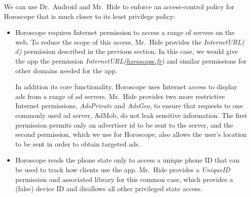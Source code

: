 \documentclass[preprint]{sig-alternate-10pt}
\newcommand{\lib}{Mr.\ Hide\xspace}
\newcommand{\rewriter}{Dr.\ Android\xspace}
\newcommand{\perm}[1]{\textsf{\textit{#1}}}
\newcommand{\comment}[3][\color{red}]{}%
\newcommand{\tdm}[1]{\comment[\color{red}]{TDM}{#1}}
\newcommand{\jeff}[1]{\comment[\color{green}]{JSF}{#1}}
\begin{document}
We can use \rewriter and \lib to enforce an access-control policy for
Horoscope that is much closer to its least privilege policy:
\begin{itemize}
\item Horoscope requires Internet permission to access a range of
  servers on the web.  To reduce the scope of this access, \lib
  provides the \perm{InternetURL($d$)} permission described in the
  previous section. In this case, we would give the app the permission
  \perm{InternetURL(\url{horoscope.fr})} and similar permissions
  for other domains needed for the app.

  In addition its core functionality, Horoscope uses Internet access
  to display ads from a range of ad servers. \lib provides two
  more restrictive Internet permissions, \perm{AdsPrivate} and \perm{AdsGeo},
  to ensure that requests to one commonly used ad server, AdMob,
  do not leak sensitive information. The first permission permits only
  an advertiser id to be sent to the server, and the second
  permission, which we use for Horoscope, also allows the user's location to
  be sent in order to obtain targeted ads.




\item Horoscope reads the phone state only to access a unique phone 
ID that
  can be used to track how clients use the app.  \lib provides a
   \perm{UniqueID} permission and associated library 
for this common case, which
  provides a (false) device ID and disallows all other privileged state
  access.


\end{itemize}
\end{document}
